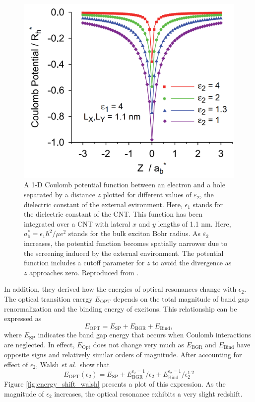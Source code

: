  \begin{figure}[ht]
 	\centering
 	\includegraphics[scale=0.23]{images/chapter_optical_props/coulomb_potl_walsh}
 	\caption{ A 1-D Coulomb potential function between an electron and a hole separated by a distance $z$ plotted for different values of $\varepsilon_2$, the dielectric constant of the external evironment. Here, $\epsilon_1$ stands for the dielectric constant of the CNT. This function has been integrated over a CNT with lateral $x$ and $y$ lengths of 1.1 nm.  Here, $a_\text{b}^* = \epsilon_1 \hbar^2 / \mu e^2$ stands for the bulk exciton Bohr radius. As $\varepsilon_2$ increases, the potential function becomes spatially narrower due to the screening induced by the external environment. The potential function includes a cutoff parameter for $z$ to avoid the divergence as $z$ approaches zero. Reproduced from \cite{walsh2008scaling}.}
 	\label{fig:coulomb_screening_walsh}
 \end{figure}

In addition, they derived how the energies of optical resonances change with $\epsilon_2$. The optical transition energy $E_\text{OPT}$ depends on the total magnitude of band gap renormalization and the binding energy of excitons. This relationship can be expressed as%
%
\begin{equation}
	E_\text{OPT} = E_\text{SP} + E_\text{BGR} + E_\text{Bind},
\end{equation}
%
where $E_\text{SP}$ indicates the band gap energy that occurs when Coulomb interactions are neglected. In effect,  $E_\text{Opt}$ does not change very much as $ E_\text{BGR}$ and $E_\text{Bind}$ have opposite signs and relatively similar orders of magnitude. After accounting for effect of $\epsilon_2$, Walsh \textit{et al}.\ show that%
%
\begin{equation}
	E_\text{OPT}(\epsilon_2) = E_\text{SP} + E_\text{BGR}^{\epsilon_2 = 1}/\epsilon_2 + E_\text{Bind}^{\epsilon_2 = 1}/\epsilon_2^{1.2}
\end{equation}
%
Figure \ref{fig:energy_shift_walsh} presents a plot of this expression. As the magnitude of $\epsilon_2$ increases, the optical resonance exhibits a very slight redshift.

